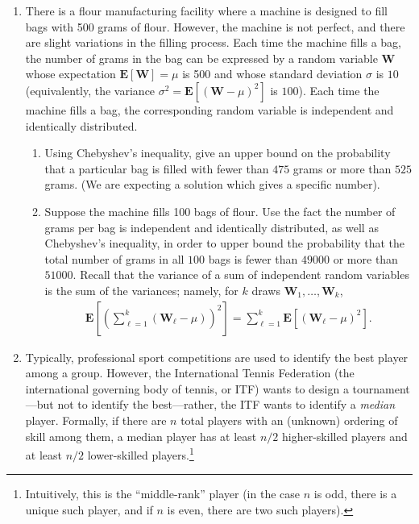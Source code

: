 \documentclass[twoside,11pt]{article}
\newcommand{\E}[1]{{\mathbf{E}\mathopen{}\left[ #1 \right]\mathclose{}}}
\newcommand{\bT}{\boldsymbol{T}}
\newcommand{\bW}{\boldsymbol{W}}
\begin{document}
\begin{enumerate}
\begin{enumerate}
	\item Compute $\E{\bT}$ using linearity of expectation, and express the final answer in terms of $n$ and the \emph{harmonic sum} $H_{n-1} = \sum_{j=1}^{n-1} 1/j$. In order to simplify the resulting expression, it is sometimes useful to consider a finite summation in the \emph{reverse} order, namely,
	\[ \sum_{k=a}^{b} f_k = \sum_{k=b}^{a} f_k.\] 
	
    \end{enumerate}

	
\item There is a flour manufacturing facility where a machine is designed to fill bags with 500 grams of flour. However, the machine is not perfect, and there are slight variations in the filling process. Each time the machine fills a bag, the number of grams in the bag can be expressed by a random variable $\bW$ whose expectation $\E{\bW} = \mu$ is 500 and whose standard deviation $\sigma$ is $10$ (equivalently, the variance $\sigma^2 = \E{(\bW - \mu)^2}$ is $100$). Each time the machine fills a bag, the corresponding random variable is independent and identically distributed.
    
\begin{enumerate}
	
	\item Using Chebyshev's inequality, give an upper bound on the probability that a particular bag is filled with fewer than $475$ grams or more than $525$ grams. (We are expecting a solution which gives a specific number).
		
	\item Suppose the machine fills 100 bags of flour. Use the fact the number of grams per bag is independent and identically distributed, as well as Chebyshev's inequality, in order to upper bound the probability that the total number of grams in all $100$ bags is fewer than $49000$ or more than $51000$. Recall that the variance of a sum of independent random variables is the sum of the variances; namely, for $k$ draws $\bW_1,\dots, \bW_k$,
	\begin{align*}
	\E{\left( \sum_{\ell=1}^k (\bW_{\ell} - \mu) \right)^2} = \sum_{\ell=1}^{k} \E{(\bW_{\ell} - \mu)^2}.
	\end{align*}

\end{enumerate}    


    

\item

Typically, professional sport competitions are used to identify the best player among a group. However, the International Tennis Federation (the international governing body of tennis, or ITF) wants to design a tournament---but not to identify the best---rather, the ITF wants to identify a \emph{median} player. Formally, if there are $n$ total players with an (unknown) ordering of skill among them, a median player has at least $n/2$ higher-skilled players and at least $n/2$ lower-skilled players.\footnote{Intuitively, this is the ``middle-rank'' player (in the case $n$ is odd, there is a unique such player, and if $n$ is even, there are two such players).}


\end{enumerate}
\end{document}
